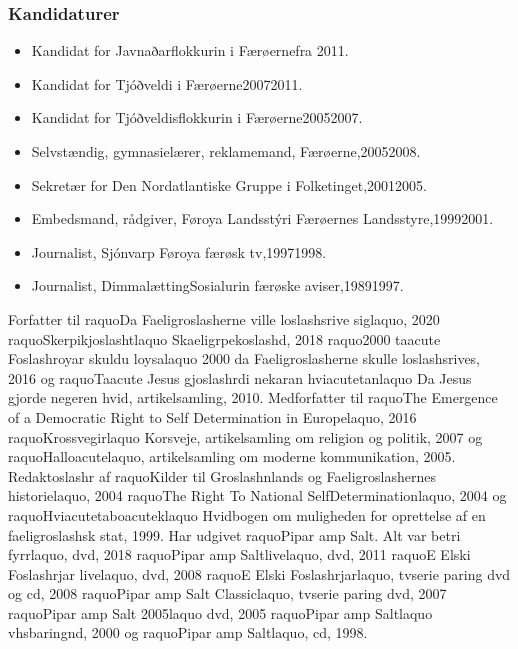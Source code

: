 \documentclass[11pt, a4paper]{awesome-cv}
\begin{document}
\begin{cvletter}
\subsubsection*{Kandidaturer}
\begin{itemize}
\item Kandidat for Javnaðarflokkurin i Færøernefra 2011.
\item Kandidat for Tjóðveldi i Færøerne20072011.
\item Kandidat for Tjóðveldisflokkurin i Færøerne20052007.
\end{itemize}
\begin{itemize}
\item Selvstændig, gymnasielærer, reklamemand, Færøerne,20052008.
\item Sekretær for Den Nordatlantiske Gruppe i Folketinget,20012005.
\item Embedsmand, rådgiver, Føroya Landsstýri Færøernes Landsstyre,19992001.
\item Journalist, Sjónvarp Føroya færøsk tv,19971998.
\item Journalist, DimmalættingSosialurin færøske aviser,19891997.
\end{itemize}
Forfatter til raquoDa Faeligroslasherne ville loslashsrive siglaquo, 2020 raquoSkerpikjoslashtlaquo Skaeligrpekoslashd, 2018 raquo2000  taacute Foslashroyar skuldu loysalaquo 2000  da Faeligroslasherne skulle loslashsrives, 2016 og raquoTaacute Jesus gjoslashrdi nekaran hviacutetanlaquo Da Jesus gjorde negeren hvid, artikelsamling, 2010. Medforfatter til raquoThe Emergence of a Democratic Right to Self Determination in Europelaquo, 2016 raquoKrossvegirlaquo Korsveje, artikelsamling om religion og politik, 2007 og raquoHalloacutelaquo, artikelsamling om moderne kommunikation, 2005. Redaktoslashr af raquoKilder til Groslashnlands og Faeligroslashernes historielaquo, 2004 raquoThe Right To National SelfDeterminationlaquo, 2004 og raquoHviacutetaboacuteklaquo Hvidbogen om muligheden for oprettelse af en faeligroslashsk stat, 1999. Har udgivet raquoPipar amp Salt. Alt var betri fyrrlaquo, dvd, 2018 raquoPipar amp Saltlivelaquo, dvd, 2011 raquoE Elski Foslashrjar livelaquo, dvd, 2008 raquoE Elski Foslashrjarlaquo, tvserie paring dvd og cd, 2008 raquoPipar amp Salt Classiclaquo, tvserie paring dvd, 2007 raquoPipar amp Salt 2005laquo dvd, 2005 raquoPipar amp Saltlaquo vhsbaringnd, 2000 og raquoPipar amp Saltlaquo, cd, 1998.

\end{cvletter}
\end{document}

